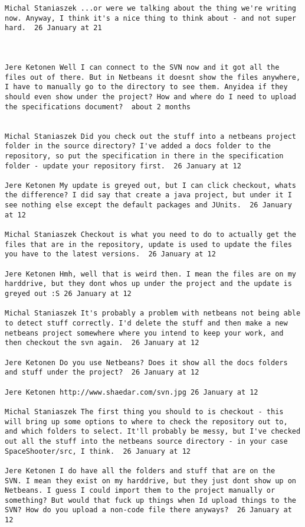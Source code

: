 \begin{verbatim}
Michal Staniaszek ‎...or were we talking about the thing we're writing
now. Anyway, I think it's a nice thing to think about - and not super
hard.  26 January at 21



Jere Ketonen Well I can connect to the SVN now and it got all the
files out of there. But in Netbeans it doesnt show the files anywhere,
I have to manually go to the directory to see them. Anyidea if they
should even show under the project? How and where do I need to upload
the specifications document?  about 2 months 
 

Michal Staniaszek Did you check out the stuff into a netbeans project
folder in the source directory? I've added a docs folder to the
repository, so put the specification in there in the specification
folder - update your repository first.  26 January at 12

Jere Ketonen My update is greyed out, but I can click checkout, whats
the difference? I did say that create a java project, but under it I
see nothing else except the default packages and JUnits.  26 January
at 12

Michal Staniaszek Checkout is what you need to do to actually get the
files that are in the repository, update is used to update the files
you have to the latest versions.  26 January at 12

Jere Ketonen Hmh, well that is weird then. I mean the files are on my
harddrive, but they dont whos up under the project and the update is
greyed out :S 26 January at 12

Michal Staniaszek It's probably a problem with netbeans not being able
to detect stuff correctly. I'd delete the stuff and then make a new
netbeans project somewhere where you intend to keep your work, and
then checkout the svn again.  26 January at 12

Jere Ketonen Do you use Netbeans? Does it show all the docs folders
and stuff under the project?  26 January at 12

Jere Ketonen http://www.shaedar.com/svn.jpg 26 January at 12

Michal Staniaszek The first thing you should to is checkout - this
will bring up some options to where to check the repository out to,
and which folders to select. It'll probably be messy, but I've checked
out all the stuff into the netbeans source directory - in your case
SpaceShooter/src, I think.  26 January at 12

Jere Ketonen I do have all the folders and stuff that are on the
SVN. I mean they exist on my harddrive, but they just dont show up on
Netbeans. I guess I could import them to the project manually or
something? But would that fuck up things when Id upload things to the
SVN? How do you upload a non-code file there anyways?  26 January at
12


\end{verbatim}
